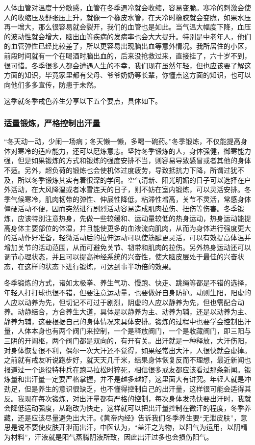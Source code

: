 人体血管对温度十分敏感，血管在冬季遇冷就会收缩，容易变脆。寒冷的刺激会使人的收缩压及舒张压上升，就像一个橡皮水管，在天冷时橡胶就会变脆，如果水压再一增大，那么很容易就会裂开，我们的血管也是如此。当气温大幅度下降，血压的波动性就会增大，脑出血等疾病的发病率也会大大提升。特别是中老年人，他们的血管弹性已经比较差了，所以更容易出现脑出血等意外情况。我所居住的小区，前段时间就有一个在喝酒时脑出血的，后来没抢救过来，直接挂了，六十岁不到，很可惜。冬季很多人都会遭遇人生的不幸，我们现在虽然年轻，但也应该要了解这方面的知识，毕竟家里都有父母、爷爷奶奶等长辈，你懂点这方面的知识，也可以向他们多多宣传，防患于未然。

这季就冬季戒色养生分享以下五个要点，具体如下。

\subsubsection{适量锻炼，严格控制出汗量}

“冬天动一动，少闹一场病；冬天懒一懒，多喝一碗药。”冬季锻炼，不仅能提高身体对寒冷的适应能力，还可以磨炼意志。坚持冬季锻炼的人，身体强健，御寒能力强，但是如果锻炼的方式和锻炼的强度安排不当，则容易导致感冒或者其他的身体不适。另外，超负荷的锻炼也会使机体过度疲劳，导致抵抗力下降，所谓过犹不及，所以冬季锻炼其实有着很深的学问。空气清新、阳光明媚的日子可以选择在户外活动，在大风降温或者冰雪连天的日子，则不妨在室内锻炼，可以灵活安排。冬季气候寒冷，肌肉韧带的弹性、伸展性降低，粘滞性增高，关节不灵活，常感身体僵硬活动不便，因而突然进行剧烈活动容易造成肌肉拉伤、扭伤等伤害。冬季锻炼，应该特别注意热身，先做一些较缓和、运动量较低的热身运动，热身运动能提高身体主要部位的体温，并且能使更多的血液流向肌肉，从而为身体进行强度更大的活动作好准备，轻微活动后的拉伸运动可以使筋腱更灵活，可以有效提高体温并增加关节的活动范围，从而可避免关节、韧带和肌肉的拉伤。另外热身运动还可以调节心理状态，并且可以提高神经系统的兴奋性，使大脑皮层处于最佳的兴奋状态，在这样的状态下进行锻炼，可达到事半功倍的效果。

冬季锻炼的方式，诸如太极拳、养生气功、慢跑、快走、跳绳等都是不错的选择，年轻人打打球也很不错，但要注意运动量，也要做好自身防护。动则生阳，阳虚的人应以动养为先，但切记不可过于剧烈，阴虚的人应以静养为先，但也需配合动养。动静结合，方合养生大道，具体是以静养为主、动养为辅，还是以动养为主、静养为辅，这要根据自己的身体情况来具体安排。锻炼的过程中也要学会控制出汗量，人体本身也有两个阀门来控制，一个是释放阀门，一个是收藏阀门，即三阳与三阴的开阖枢，两个阀门都是双向的，有开有关。出汗就是一种释放，大汗伤阳，对身体恢复很不利，偶尔一次大汗还不觉得，如果经常出大汗，人很快就会虚掉。之前就有戒友听说跑步好，就天天几千米，结果身体恢复反而不理想，最近新闻也报道过一个退役特种兵在跑马拉松时猝死，相信很多戒友都应该看过那条新闻。锻炼量和出汗量一定要严格掌握，并不是越多越好，这里面大有讲究。年轻人就是冲劲足，但是养生的意识很缺乏，也不懂得控制自己的出汗量，这样很可能会适得其反。我现在每次锻炼，对出汗量都有严格的控制，每次身体发热快要出汗时，我就会降低运动强度，从跑改为快走，这样就可以把出汗量控制在微汗的程度，冬季养藏，还是应该尽量避免出大汗。《黄帝内经》告诉我们冬季养生要“无泄皮肤”，意思是说不要使皮肤开泄而出汗，中医认为，“盖汗之为物，以阳气为运用，以阴精为材料”，汗液就是阳气蒸腾阴液所致，因此出汗过多也会损伤阳气。

